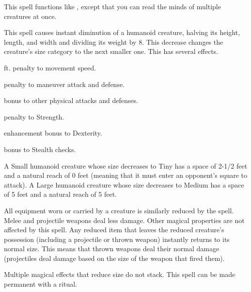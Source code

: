 \begin{spelleffect}
    This spell functions like , except that you can read the minds of multiple creatures at once. 
\end{spelleffect}

\spelldur{\durshort \dismissable}
\begin{spelleffect}
    This spell causes instant diminution of a humanoid creature, halving its height, length, and width and dividing its weight by 8. This decrease changes the creature's size category to the next smaller one. This has several effects.
    \begin{itemize*} 
        \item {} ft. penalty to movement speed.
        \item {} penalty to maneuver attack and defense.
        \item {} bonus to other physical attacks and defenses.
        \item {} penalty to Strength.
        \item {} enhancement bonus to Dexterity.
        \item {} bonus to Stealth checks.
    \end{itemize*}
    \par A Small humanoid creature whose size decreases to Tiny has a space of 2-1/2 feet and a natural reach of 0 feet (meaning that it must enter an opponent's square to attack). A Large humanoid creature whose size decreases to Medium has a space of 5 feet and a natural reach of 5 feet.
    \par All equipment worn or carried by a creature is similarly reduced by the spell. Melee and projectile weapons deal less damage. Other magical properties are not affected by this spell. Any reduced item that leaves the reduced creature's possession (including a projectile or thrown weapon) instantly returns to its normal size. This means that thrown weapons deal their normal damage (projectiles deal damage based on the size of the weapon that fired them).
\end{spelleffect}
\begin{spellnotes}
    Multiple magical effects that reduce size do not stack. This spell can be made permanent with a  ritual.
\end{spellnotes}

